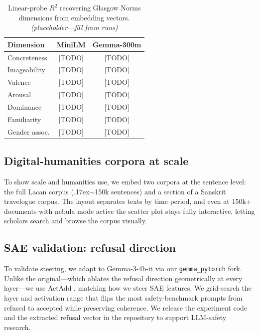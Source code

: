 \documentclass[11pt]{article}
\begin{document}
\begin{table}[t]
  \centering
  \small
  \begin{tabular}{lcc}
    \toprule
    Dimension & MiniLM & Gemma-300m \\
    \midrule
    Concreteness  & [TODO] & [TODO] \\
    Imageability  & [TODO] & [TODO] \\
    Valence       & [TODO] & [TODO] \\
    Arousal       & [TODO] & [TODO] \\
    Dominance     & [TODO] & [TODO] \\
    Familiarity   & [TODO] & [TODO] \\
    Gender assoc. & [TODO] & [TODO] \\
    \bottomrule
  \end{tabular}
  \caption{Linear-probe $R^2$ recovering Glasgow Norms dimensions from
  embedding vectors. \emph{(placeholder---fill from runs)}}
  \label{tab:probes}
\end{table}

\subsection{Digital-humanities corpora at scale}
\label{sec:dh}
To show scale and humanities use, we embed two corpora at the sentence
level: the full Lacan corpus (\raise.17ex\hbox{$\scriptstyle\sim$}150k
sentences) and a section of a Sanskrit travelogue corpus. The layout
separates texts by time period, and even at 150k+ documents with nebula
mode active the scatter plot stays fully interactive, letting scholars
search and browse the corpus visually.

\subsection{SAE validation: refusal direction}
\label{sec:refusal}
To validate steering, we adapt \citet{arditi2024refusal} to Gemma-3-4b-it
via our \texttt{gemma\_pytorch} fork. Unlike the original---which ablates
the refusal direction geometrically at every layer---we use ActAdd
\citep{turner2023actadd}, matching how we steer SAE features. We grid-search
the layer and activation range that flips the most safety-benchmark prompts
from refused to accepted while preserving coherence.
We release the experiment code and the extracted refusal vector in the
repository to support LLM-safety research.
\end{document}

